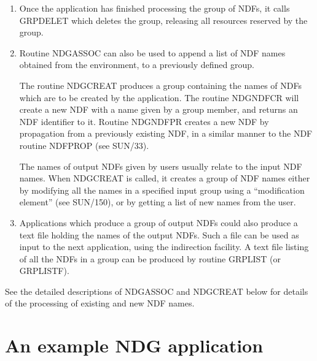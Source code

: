 \documentclass[twoside,11pt]{article}
\newcommand{\htmlref}[2]{#1}
\newcommand{\xref}[3]{#1}
\renewcommand{\_}{\texttt{\symbol{95}}}
\begin{document}
\begin{enumerate}
\item Once the application has finished processing the group of NDFs, it calls 
\xref{GRP\_DELET}{sun150}{GRP\_DELET} which deletes the group, releasing all resources reserved by the group.

\item Routine NDG\_ASSOC can also be used to append a list of NDF names 
obtained from the environment, to a previously defined group.

The routine \htmlref{NDG\_CREAT}{NDG\_CREAT} produces a group containing the names of 
NDFs which are to be created by the application. The routine \htmlref{NDG\_NDFCR}{NDG\_NDFCR} will 
create a new NDF with a name given by a group member, and returns an NDF 
identifier to it. Routine \htmlref{NDG\_NDFPR}{NDG\_NDFPR} creates a new NDF by propagation from a 
previously existing NDF, in a similar manner to the NDF routine \xref{NDF\_PROP}{sun33}{NDF\_PROP} (see 
\xref{SUN/33}{sun33}{}).

The names of output NDFs given by users usually relate to the input NDF names.
When NDG\_CREAT is called, it creates a group of NDF names either by modifying
all the names in a specified input group using a ``modification element'' (see
\xref{SUN/150}{sun150}{}), or by getting a list of new names from the user. 

\item Applications which produce a group of output NDFs could also produce a
text file holding the names of the output NDFs. Such a file can be used
as input to the next application, using the indirection facility. A text
file listing of all the NDFs in a group can be produced by routine
GRP\_LIST (or GRP\_LISTF).

\end{enumerate}

See the detailed descriptions of \htmlref{NDG\_ASSOC}{NDG\_ASSOC} and \htmlref{NDG\_CREAT}{NDG\_CREAT} below for details 
of the processing of existing and new NDF names.

\section{An example NDG application}
\end{document}
